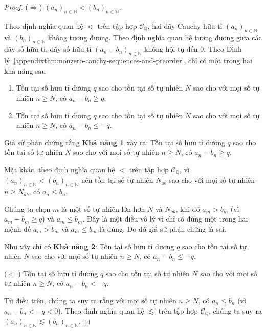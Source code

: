 \begin{proof}
    ($\Rightarrow$) ${(a_{n})}_{n\in\mathbb{N}} < {(b_{n})}_{n\in\mathbb{N}}$.

    Theo định nghĩa quan hệ $<$ trên tập hợp $\mathscr{C}_{\mathbb{Q}}$, hai dãy Cauchy hữu tỉ ${(a_{n})}_{n\in\mathbb{N}}$ và ${(b_{n})}_{n\in\mathbb{N}}$ không tương đương. Theo định nghĩa quan hệ tương đương giữa các dãy số hữu tỉ, dãy số hữu tỉ ${(a_{n} - b_{n})}_{n\in\mathbb{N}}$ không hội tụ đến $0$. Theo Định lý~\ref{appendixthm:nonzero-cauchy-sequences-and-preorder}, chỉ có một trong hai khả năng sau
    \begin{enumerate}[label={\textbf{Khả năng \arabic*.}},itemindent=2cm]
        \item Tồn tại số hữu tỉ dương $q$ sao cho tồn tại số tự nhiên $N$ sao cho với mọi số tự nhiên $n\geq N$, có $a_{n} - b_{n}\geq q$.
        \item Tồn tại số hữu tỉ dương $q$ sao cho tồn tại số tự nhiên $N$ sao cho với mọi số tự nhiên $n\geq N$, có $a_{n} - b_{n}\leq -q$.
    \end{enumerate}

    Giả sử phản chứng rằng \textbf{Khả năng 1} xảy ra: Tồn tại số hữu tỉ dương $q$ sao cho tồn tại số tự nhiên $N$ sao cho với mọi số tự nhiên $n\geq N$, có $a_{n} - b_{n}\geq q$.

    Mặt khác, theo định nghĩa quan hệ $<$ trên tập hợp $\mathscr{C}_{\mathbb{Q}}$, vì ${(a_{n})}_{n\in\mathbb{N}} < {(b_{n})}_{n\in\mathbb{N}}$ nên tồn tại số tự nhiên $N_{ab}$ sao cho với mọi số tự nhiên $n\geq N_{ab}$, có $a_{n}\leq b_{n}$.

    Chúng ta chọn $m$ là một số tự nhiên lớn hơn $N$ và $N_{ab}$, khi đó $a_{m} > b_{m}$ (vì $a_{m} - b_{m}\geq q$) và $a_{m}\leq b_{m}$. Đây là một điều vô lý vì chỉ có đúng một trong hai mệnh đề $a_{m} > b_{m}$ và $a_{m}\leq b_{m}$ là đúng. Do đó giả sử phản chứng là sai.

    Như vậy chỉ có \textbf{Khả năng 2}: Tồn tại số hữu tỉ dương $q$ sao cho tồn tại số tự nhiên $N$ sao cho với mọi số tự nhiên $n\geq N$, có $a_{n} - b_{n}\leq -q$.

    \bigskip

    ($\Leftarrow$) Tồn tại số hữu tỉ dương $q$ sao cho tồn tại số tự nhiên $N$ sao cho với mọi số tự nhiên $n\geq N$, có $a_{n} - b_{n} < -q$.

    Từ điều trên, chúng ta suy ra rằng với mọi số tự nhiên $n\geq N$, có $a_{n}\leq b_{n}$ (vì $a_{n} - b_{n} < -q < 0$). Theo định nghĩa quan hệ $\lesssim$ trên tập hợp $\mathscr{C}_{\mathbb{Q}}$, chúng ta suy ra ${(a_{n})}_{n\in\mathbb{N}}\lesssim {(b_{n})}_{n\in\mathbb{N}}$.


\end{proof}
